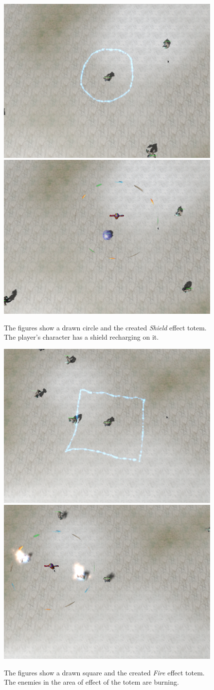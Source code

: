 \begin{figure}[p]
\centering
\includegraphics[width=.47\linewidth]{ext/scr/circle.png}
\quad
\includegraphics[width=.47\linewidth]{ext/scr/circlee.png}
\caption{The figures show a drawn circle and the created \emph{Shield} effect totem. The player's character has a shield recharging on it. }
\label{fig:spell:circle}
\end{figure}

\begin{figure}[p]
\centering
\includegraphics[width=.47\linewidth]{ext/scr/square.png}
\quad
\includegraphics[width=.47\linewidth]{ext/scr/squaree.png}
\caption{The figures show a drawn square and the created \emph{Fire} effect totem. The enemies in the area of effect of the totem are burning. }
\label{fig:spell:square}
\end{figure}

